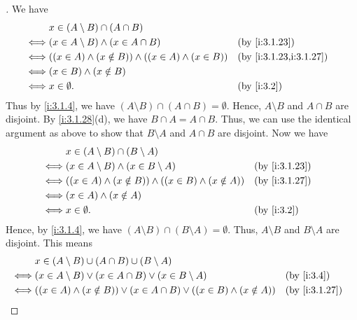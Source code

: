 \begin{proof}[]
  We have
  \begin{align*}
         & x \in (A \setminus B) \cap (A \cap B)                                                        \\
    \iff & (x \in A \setminus B) \land (x \in A \cap B)                     &  & \by{i:3.1.23}          \\
    \iff & ((x \in A) \land (x \notin B)) \land ((x \in A) \land (x \in B)) &  & \by{i:3.1.23,i:3.1.27} \\
    \iff & (x \in B) \land (x \notin B)                                                                 \\
    \iff & x \in \emptyset.                                                 &  & \by{i:3.2}
  \end{align*}
  Thus by \cref{i:3.1.4}, we have \((A \setminus B) \cap (A \cap B) = \emptyset\).
  Hence, \(A \setminus B\) and \(A \cap B\) are disjoint.
  By \cref{i:3.1.28}(d), we have \(B \cap A = A \cap B\).
  Thus, we can use the identical argument as above to show that \(B \setminus A\) and \(A \cap B\) are disjoint.
  Now we have
  \begin{align*}
         & x \in (A \setminus B) \cap (B \setminus A)                                             \\
    \iff & (x \in A \setminus B) \land (x \in B \setminus A)                   &  & \by{i:3.1.23} \\
    \iff & ((x \in A) \land (x \notin B)) \land ((x \in B) \land (x \notin A)) &  & \by{i:3.1.27} \\
    \iff & (x \in A) \land (x \notin A)                                                           \\
    \iff & x \in \emptyset.                                                    &  & \by{i:3.2}
  \end{align*}
  Hence, by \cref{i:3.1.4}, we have \((A \setminus B) \cap (B \setminus A) = \emptyset\).
  Thus, \(A \setminus B\) and \(B \setminus A\) are disjoint.
  This means
  \begin{align*}
         & x \in (A \setminus B) \cup (A \cap B) \cup (B \setminus A)                                                             \\
    \iff & (x \in A \setminus B) \lor (x \in A \cap B) \lor (x \in B \setminus A)                              &  & \by{i:3.4}    \\
    \iff & ((x \in A) \land (x \notin B)) \lor (x \in A \cap B) \lor ((x \in B) \land (x \notin A))            &  & \by{i:3.1.27} \\

\end{align*}
\end{proof}
